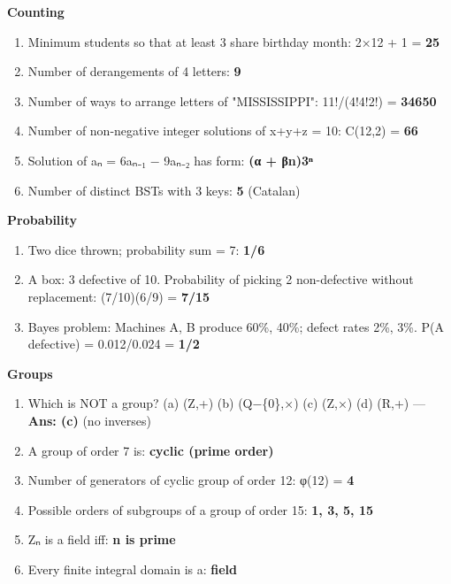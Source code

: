 \textbf{Counting}

\begin{enumerate}
\def\labelenumi{\arabic{enumi}.}
\setcounter{enumi}{14}
\tightlist
\item
  Minimum students so that at least 3 share birthday month: 2×12 + 1 = \textbf{25}
\item
  Number of derangements of 4 letters: \textbf{9}
\item
  Number of ways to arrange letters of "MISSISSIPPI": 11!/(4!4!2!) = \textbf{34650}
\item
  Number of non-negative integer solutions of x+y+z = 10: C(12,2) = \textbf{66}
\item
  Solution of aₙ = 6aₙ₋₁ − 9aₙ₋₂ has form: \textbf{(α + βn)3ⁿ}
\item
  Number of distinct BSTs with 3 keys: \textbf{5} (Catalan)
\end{enumerate}

\textbf{Probability}

\begin{enumerate}
\def\labelenumi{\arabic{enumi}.}
\setcounter{enumi}{20}
\tightlist
\item
  Two dice thrown; probability sum = 7: \textbf{1/6}
\item
  A box: 3 defective of 10. Probability of picking 2 non-defective without replacement: (7/10)(6/9) = \textbf{7/15}
\item
  Bayes problem: Machines A, B produce 60\%, 40\%; defect rates 2\%, 3\%. P(A \textbar{} defective) = 0.012/0.024 = \textbf{1/2}
\end{enumerate}

\textbf{Groups}

\begin{enumerate}
\def\labelenumi{\arabic{enumi}.}
\setcounter{enumi}{23}
\tightlist
\item
  Which is NOT a group? (a) (Z,+) (b) (Q−\{0\},×) (c) (Z,×) (d) (R,+) --- \textbf{Ans: (c)} (no inverses)
\item
  A group of order 7 is: \textbf{cyclic (prime order)}
\item
  Number of generators of cyclic group of order 12: φ(12) = \textbf{4}
\item
  Possible orders of subgroups of a group of order 15: \textbf{1, 3, 5, 15}
\item
  Zₙ is a field iff: \textbf{n is prime}
\item
  Every finite integral domain is a: \textbf{field}
\end{enumerate}

